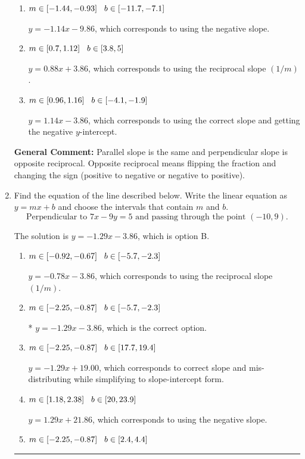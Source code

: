 \documentclass{extbook}[14pt]
\newcommand{\litem}[1]{\item #1

\rule{\textwidth}{0.4pt}}
\begin{document}
\begin{enumerate}
{\begin{enumerate}[label=\Alph*.]
* $y = 1.14x + 3.86$, which is the correct option.
\item \( m \in [-1.44, -0.93] \hspace*{3mm} b \in [-11.7, -7.1] \)

 $y = -1.14x - 9.86$, which corresponds to using the negative slope.
\item \( m \in [0.7, 1.12] \hspace*{3mm} b \in [3.8, 5] \)

 $y = 0.88x + 3.86$, which corresponds to using the reciprocal slope $(1/m)$.
\item \( m \in [0.96, 1.16] \hspace*{3mm} b \in [-4.1, -1.9] \)

 $y = 1.14x - 3.86$, which corresponds to using the correct slope and getting the negative $y$-intercept.
\end{enumerate}

\textbf{General Comment:} Parallel slope is the same and perpendicular slope is opposite reciprocal. Opposite reciprocal means flipping the fraction and changing the sign (positive to negative or negative to positive).
}
\litem{
Find the equation of the line described below. Write the linear equation as $ y=mx+b $ and choose the intervals that contain $m$ and $b$.
\[ \text{Perpendicular to } 7 x - 9 y = 5 \text{ and passing through the point } (-10, 9). \]

The solution is \( y = -1.29x - 3.86 \), which is option B.\begin{enumerate}[label=\Alph*.]
\item \( m \in [-0.92, -0.67] \hspace*{3mm} b \in [-5.7, -2.3] \)

 $y = -0.78x - 3.86$, which corresponds to using the reciprocal slope $(1/m)$.
\item \( m \in [-2.25, -0.87] \hspace*{3mm} b \in [-5.7, -2.3] \)

* $y = -1.29x - 3.86$, which is the correct option.
\item \( m \in [-2.25, -0.87] \hspace*{3mm} b \in [17.7, 19.4] \)

 $y = -1.29x + 19.00$, which corresponds to correct slope and mis-distributing while simplifying to slope-intercept form.
\item \( m \in [1.18, 2.38] \hspace*{3mm} b \in [20, 23.9] \)

 $y = 1.29x + 21.86$, which corresponds to using the negative slope.
\item \( m \in [-2.25, -0.87] \hspace*{3mm} b \in [2.4, 4.4] \)


\end{enumerate}}
\end{enumerate}
\end{document}
